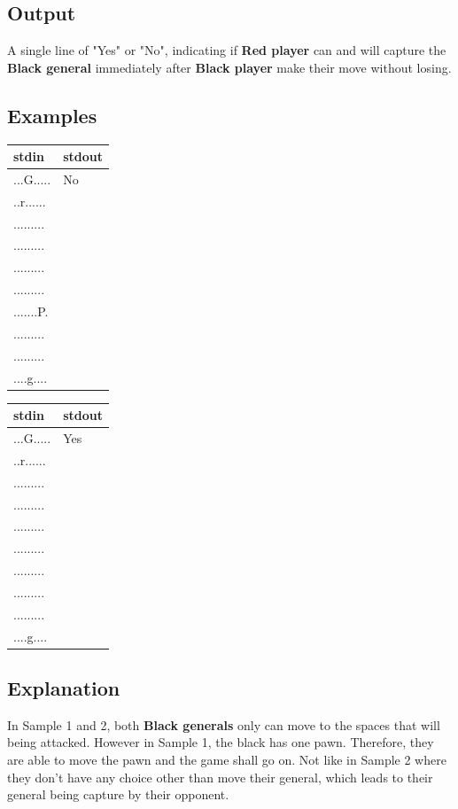 \documentclass[12pt,a4paper]{article}
\begin{document}
\subsection*{\fontsize{16}{12}Output}
A single line of "Yes" or "No", indicating if \textbf{Red player} can and will capture the \textbf{Black general} immediately after \textbf{Black player} make their move without losing.
\subsection*{\fontsize{16}{12}Examples}
\begin{table}[h]
  \centering
  \begin{tabularx}{\textwidth}{|>{\ttfamily}X|>{\ttfamily}X|}
  \hline
  stdin & stdout\\
  \hline
    ...G.....&No\\
    ..r......&\\
    .........&\\
    .........&\\
    .........&\\
    .........&\\
    .......P.&\\
    .........&\\
    .........&\\
    ....g....&\\
  \hline
 \end{tabularx}
\end{table}

\begin{table}[h]
  \centering
  \begin{tabularx}{\textwidth}{|>{\ttfamily}X|>{\ttfamily}X|}
  \hline
  stdin & stdout\\
  \hline
    ...G.....&Yes\\
    ..r......&\\
    .........&\\
    .........&\\
    .........&\\
    .........&\\
    .........&\\
    .........&\\
    .........&\\
    ....g....&\\
  \hline
 \end{tabularx}
\end{table}

\subsection*{\fontsize{16}{12}Explanation}
In Sample 1 and 2, both \textbf{Black generals} only can move to the spaces that will being attacked. However in Sample 1, the black has one pawn. Therefore, they are able to move the pawn and the game shall go on. Not like in Sample 2 where they don't have any choice other than move their general, which leads to their general being capture by their opponent.
\end{document}
